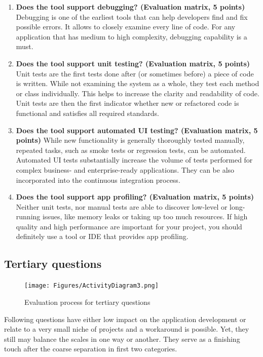 \documentclass[english,master,public,dept460,male,cpdeclaration,oneside]{diploma}
\begin{document}
\begin{enumerate}
	\item \textbf{Does the tool support debugging? (Evaluation matrix, 5 points) }
	Debugging is one of the earliest tools that can help developers find and fix possible errors. It allows to closely examine every line of code. For any application that has medium to high complexity, debugging capability is a must.
	
	\item \textbf{Does the tool support unit testing? (Evaluation matrix, 5 points) }
	Unit tests are the first tests done after (or sometimes before) a piece of code is written. While not examining the system as a whole, they test each method or class individually. This helps to increase the clarity and readability of code. Unit tests are then the first indicator whether new or refactored code is functional and satisfies all required standards.
	
	\item \textbf{Does the tool support automated UI testing? (Evaluation matrix, 5 points) }
	While new functionality is generally thoroughly tested manually, repeated tasks, such as smoke tests or regression tests, can be automated. Automated UI tests substantially increase the volume of tests performed for complex business- and enterprise-ready applications. They can be also incorporated into the continuous integration process.
	
	\item \textbf{Does the tool support app profiling? (Evaluation matrix, 5 points) }
	Neither unit tests, nor manual tests are able to discover low-level or long-running issues, like memory leaks or taking up too much resources. If high quality and high performance are important for your project, you should definitely use a tool or IDE that provides app profiling.
\end{enumerate}



\subsection{Tertiary questions}

\begin{figure}
	\centering\texttt{[image: Figures/ActivityDiagram3.png]}
	\caption{Evaluation process for tertiary questions}
\end{figure}

Following questions have either low impact on the application development or relate to a very small niche of projects and a workaround is possible. Yet, they still may balance the scales in one way or another. They serve as a finishing touch after the coarse separation in first two categories.
\end{document}
